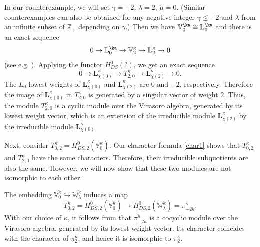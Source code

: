 \documentclass{amsart}
\newcommand{\+}{\mathop{\oplus}}
\renewcommand{\*}{{\otimes}}
\newcommand{\Z}{\mathbb{Z}}
\newcommand{\ra}{\rightarrow}
\newcommand{\lam}{\lambda}
\def\leq{\leqslant}
\theoremstyle{theorem}
\theoremstyle{remark}
\numberwithin{equation}{section}
\begin{document}
In our counterexample, we will set $\gamma=-2$, $\lam=2$,
$\check{\mu}=0$. (Similar counterexamples can also be obtained for any
negative integer $\gamma \leq -2$ and $\lam$ from an infinite
subset of $\Z_+$ depending on $\gamma$.) Then we have
$\mathbb{V}^\ka_0\cong \mathbb{L}^\ka_0$ and there is an exact
sequence
$$
0\ra \mathbb{L}^\ka_0\ra \mathbb{V}^\kappa_{2}\ra
\mathbb{L}^\kappa_{2}\ra 0
$$
(see e.g. \cite{Mal90,KasTan95}). Applying the functor $H_{DS}^0(?)$,
we get an exact sequence
\begin{equation}    \label{exact1}
0\ra \mathbf{L}_{\chi(0)}^\kappa \ra T^\kappa_{2,0}\ra 
\mathbf{L}_{\chi(2)}^\kappa\ra 0.
\end{equation}
The $L_0$-lowest weights of $\mathbf{L}_{\chi(0)}^\kappa$ and
$\mathbf{L}_{\chi(2)}^\kappa$ are $0$ and $-2$, respectively.
Therefore the image of $\mathbf{L}_{\chi(0)}^\kappa$ in
$T^\kappa_{2,0}$ is generated by a singular vector of weight
$2$. Thus, the module $T^\kappa_{2,0}$ is a cyclic module over the
Virasoro algebra, generated by its lowest weight vector, which is an
extension of the irreducible module $\mathbf{L}_{\chi(2)}^\kappa$ by
the irreducible module $\mathbf{L}_{\chi(0)}^\kappa$.

Next, consider
$T^{\check{\kappa}}_{0,2}=H_{DS,2}^0(\mathbb{V}^{\check{\kappa}}_0)$.
Our character formula \eqref{char1} shows that
$T^{\check{\kappa}}_{0,2}$ and $T^\kappa_{2,0}$ have the same
characters. Therefore, their irreducible subquotients are also the
same. However, we will now show that these two modules are not
isomorphic to each other.

The embedding
$\mathbb{V}^{\check{\kappa}}_0 \hookrightarrow
\mathbb{W}_{\lam}^{\check{\kappa}}$ induces a map
\begin{equation}    \label{Ttopi}
T^{\check{\kappa}}_{0,2}=H_{DS,2}^0(\mathbb{V}^{\check{\kappa}}_0) \to
H_{DS,2}^0(\mathbb{W}_{\lam}^{\check{\kappa}})
=\pi^{\check{\kappa}}_{-2\check{\kappa}}.
\end{equation}
With our choice of $\kappa$, it follows from \cite{Fre92} that
$\pi^{\check{\kappa}}_{-2\check{\kappa}}$ is a cocyclic module over
the Virasoro algebra, generated by its lowest weight vector. Its
character coincides with the character of $\pi^{\kappa}_{2}$, and
hence it is isomorphic to $\pi^{\kappa}_{2}$.
\end{document}
